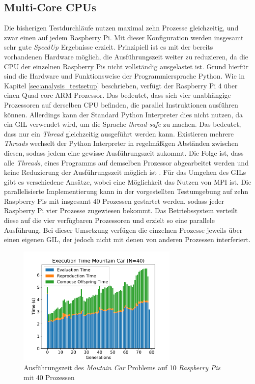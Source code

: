 \subsection{Multi-Core CPUs}
Die bisherigen Testdurchläufe nutzen maximal zehn Prozesse gleichzeitig, und zwar einen auf jedem Raspberry Pi. Mit dieser Konfiguration werden insgesamt sehr gute \emph{SpeedUp} Ergebnisse erzielt. Prinzipiell ist es mit der bereits vorhandenen Hardware möglich, die Ausführungszeit weiter zu reduzieren, da die \ac{CPU} der einzelnen Raspberry Pis nicht vollständig ausgelastet ist. Grund hierfür sind die Hardware und Funktionsweise der Programmiersprache Python. Wie in Kapitel \ref{sec:analysis_testsetup} beschrieben, verfügt der Raspberry Pi 4 über einen Quad-core ARM Prozessor. Das bedeutet, dass sich vier unabhängige Prozessoren auf derselben \ac{CPU} befinden, die parallel Instruktionen ausführen können. Allerdings kann der Standard Python Interpreter dies nicht nutzen, da ein \ac{GIL} verwendet wird, um die Sprache \emph{thread-safe} zu machen. Das bedeutet, dass nur ein \emph{Thread} gleichzeitig ausgeführt werden kann. Existieren mehrere \emph{Threads} wechselt der Python Interpreter in regelmäßigen Abständen zwischen diesen, sodass jedem eine gewisse Ausführungszeit zukommt. Die Folge ist, dass alle \emph{Threads}, eines Programms auf demselben Prozessor abgearbeitet werden und keine Reduzierung der Ausführungszeit möglich ist \cite{marowka2018python}. Für das Umgehen des \acp{GIL} gibt es verschiedene Ansätze, wobei eine Möglichkeit das Nutzen von \ac{MPI} ist. Die parallelisierte Implementierung kann in der vorgestellten Testumgebung auf zehn Raspberry Pis mit insgesamt $40$ Prozessen gestartet werden, sodass jeder Raspberry Pi vier Prozesse zugewiesen bekommt. Das Betriebssystem verteilt diese auf die vier verfügbaren Prozessoren und erzielt so eine parallele Ausführung. Bei dieser Umsetzung verfügen die einzelnen Prozesse jeweils über einen eigenen \ac{GIL}, der jedoch nicht mit denen von anderen Prozessen interferiert.
\begin{figure}[!h]
	\centering
	\includegraphics[width=0.7\textwidth]{./img/mountain_car_analysis/1413_time_40core_10pi.pdf} 
	\caption{Ausführungszeit des \emph{Moutain Car} Problems auf 10 \emph{Raspberry Pis} mit 40 Prozessen}
	\label{fig:mountain_car_time_40core_10pi}
\end{figure}
